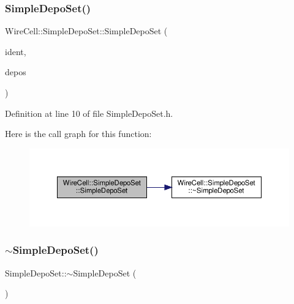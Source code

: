 \subsubsection{\texorpdfstring{Simple\+Depo\+Set()}{SimpleDepoSet()}}
{\footnotesize\ttfamily Wire\+Cell\+::\+Simple\+Depo\+Set\+::\+Simple\+Depo\+Set (\begin{DoxyParamCaption}\item[{int}]{ident,  }\item[{const \hyperlink{class_wire_cell_1_1_i_data_ae1a9f863380499bb43f39fabb6276660}{I\+Depo\+::vector} \&}]{depos }\end{DoxyParamCaption})\hspace{0.3cm}{\ttfamily [inline]}}



Definition at line 10 of file Simple\+Depo\+Set.\+h.

Here is the call graph for this function\+:
\nopagebreak
\begin{figure}[H]
\begin{center}
\leavevmode
\includegraphics[width=350pt]{class_wire_cell_1_1_simple_depo_set_aa842c6310fa4b73bc30cf62913a6737b_cgraph}
\end{center}
\end{figure}
\mbox{\label{class_wire_cell_1_1_simple_depo_set_ac005a5edae9e6e2da09983f4c798db78}} 
\subsubsection{\texorpdfstring{$\sim$\+Simple\+Depo\+Set()}{~SimpleDepoSet()}}
{\footnotesize\ttfamily Simple\+Depo\+Set\+::$\sim$\+Simple\+Depo\+Set (\begin{DoxyParamCaption}{ }\end{DoxyParamCaption})\hspace{0.3cm}{\ttfamily [virtual]}}



